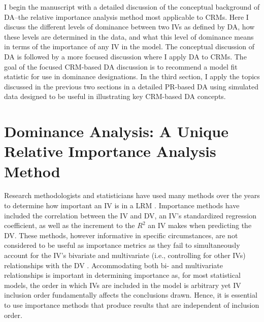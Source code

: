 \documentclass[doc]{apa7}
\begin{document}
	I begin the manuscript with a detailed discussion of the conceptual background of DA--the relative importance analysis method most applicable to CRMs.	
 	Here I discuss the different levels of dominance between two IVs as defined by DA, how these levels are determined in the data, and what this level of dominance means in terms of the importance of any IV in the model.
	The conceptual discussion of DA is followed by a more focused discussion where I apply DA to CRMs.
	The goal of the focused CRM-based DA discussion is to recommend a model fit statistic for use in dominance designations.
	In the third section, I apply the topics discussed in the previous two sections in a detailed PR-based DA using simulated data designed to be useful in illustrating key CRM-based DA concepts.
		
\section{Dominance Analysis: A Unique Relative Importance Analysis Method}

	Research methodologists and statisticians have used many methods over the years to determine how important an IV is in a LRM \parencite[see reviews in][]{gromping2007estimators, johnson2004history}.
	Importance methods have included the correlation between the IV and DV, an IV's standardized regression coefficient, as well as the increment to the $R^2$ an IV makes when predicting the DV.
	These methods, however informative in specific circumstances, are not considered to be useful as importance metrics as they fail to simultaneously account for the IV's bivariate and multivariate (i.e., controlling for other IVs) relationships with the DV \parencite{johnson2004history}.
	Accommodating both bi- and multivariate relationships is important in determining importance as, for most statistical models, the order in which IVs are included in the model is arbitrary yet IV inclusion order fundamentally affects the conclusions drawn.
	Hence, it is essential to use importance methods that produce results that are independent of inclusion order.
	
\end{document}
